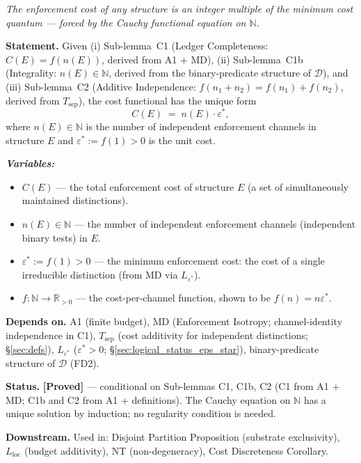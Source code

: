 \documentclass[11pt]{article}
\theoremstyle{remark}
\newenvironment{varlist}{\begin{itemize}[nosep,leftmargin=2em]}{\end{itemize}}
\begin{document}
\begin{tcolorbox}[apfbox, title={$L_{\mathrm{cost}}$: Cost Functional Form Uniqueness}]
\textit{The enforcement cost of any structure is an integer multiple of the minimum cost quantum --- forced by the Cauchy functional equation on $\mathbb{N}$.}

\smallskip\noindent\textbf{Statement.}  Given (i) Sub-lemma~C1 (Ledger Completeness: $C(E) = f(n(E))$, derived from A1 + MD), (ii) Sub-lemma~C1b (Integrality: $n(E) \in \mathbb{N}$, derived from the binary-predicate structure of $\mathcal{D}$), and (iii) Sub-lemma~C2 (Additive Independence: $f(n_1 + n_2) = f(n_1) + f(n_2)$, derived from $T_{\mathrm{sep}}$), the cost functional has the unique form
\[
C(E) \;=\; n(E)\cdot\varepsilon^*,
\]
where $n(E) \in \mathbb{N}$ is the number of independent enforcement channels in structure $E$ and $\varepsilon^* := f(1) > 0$ is the unit cost.

\smallskip\noindent\textbf{\textit{Variables:}}
\begin{varlist}
\item $C(E)$ --- the total enforcement cost of structure $E$ (a set of simultaneously maintained distinctions).
\item $n(E) \in \mathbb{N}$ --- the number of independent enforcement channels (independent binary tests) in $E$.
\item $\varepsilon^* := f(1) > 0$ --- the minimum enforcement cost: the cost of a single irreducible distinction (from MD via $L_{\varepsilon^*}$).
\item $f: \mathbb{N} \to \mathbb{R}_{>0}$ --- the cost-per-channel function, shown to be $f(n) = n\varepsilon^*$.
\end{varlist}

\smallskip\noindent\textbf{Depends on.}  A1 (finite budget), MD (Enforcement Isotropy; channel-identity independence in C1), $T_{\mathrm{sep}}$ (cost additivity for independent distinctions; \S\ref{sec:defs}), $L_{\varepsilon^*}$ ($\varepsilon^* > 0$; \S\ref{sec:logical_status_eps_star}), binary-predicate structure of $\mathcal{D}$ (FD2).

\smallskip\noindent\textbf{Status.}  \textbf{[Proved]} --- conditional on Sub-lemmas C1, C1b, C2 (C1 from A1 + MD; C1b and C2 from A1 + definitions).  The Cauchy equation on $\mathbb{N}$ has a unique solution by induction; no regularity condition is needed.

\smallskip\noindent\textbf{Downstream.}  Used in: Disjoint Partition Proposition (substrate exclusivity), $L_{\mathrm{loc}}$ (budget additivity), NT (non-degeneracy), Cost Discreteness Corollary.


\end{tcolorbox}
\end{document}
